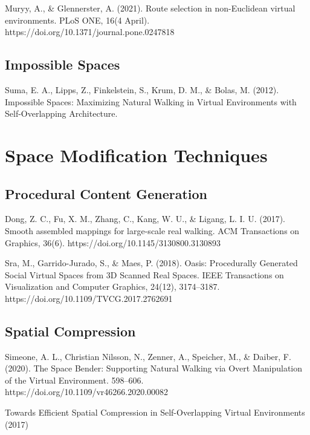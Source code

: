 Muryy, A., \& Glennerster, A. (2021). Route selection in non-Euclidean virtual environments. PLoS ONE, 16(4 April). https://doi.org/10.1371/journal.pone.0247818


\subsection{Impossible Spaces}
\label{sec:impossible-spaces}

Suma, E. A., Lipps, Z., Finkelstein, S., Krum, D. M., \& Bolas, M. (2012). Impossible Spaces: Maximizing Natural Walking in Virtual Environments with Self-Overlapping Architecture.

\section{Space Modification Techniques}
\label{sec:spatial-techniques}

\subsection{Procedural Content Generation}
\label{sec:pcg}

Dong, Z. C., Fu, X. M., Zhang, C., Kang, W. U., \& Ligang, L. I. U. (2017). Smooth assembled mappings for large-scale real walking. ACM Transactions on Graphics, 36(6). https://doi.org/10.1145/3130800.3130893

Sra, M., Garrido-Jurado, S., \& Maes, P. (2018). Oasis: Procedurally Generated Social Virtual Spaces from 3D Scanned Real Spaces. IEEE Transactions on Visualization and Computer Graphics, 24(12), 3174–3187. https://doi.org/10.1109/TVCG.2017.2762691

\subsection{Spatial Compression}
\label{sec:spatial-compression}

Simeone, A. L., Christian Nilsson, N., Zenner, A., Speicher, M., \& Daiber, F. (2020). The Space Bender: Supporting Natural Walking via Overt Manipulation of the Virtual Environment. 598–606. https://doi.org/10.1109/vr46266.2020.00082

Towards Efficient Spatial Compression in Self-Overlapping Virtual Environments (2017)